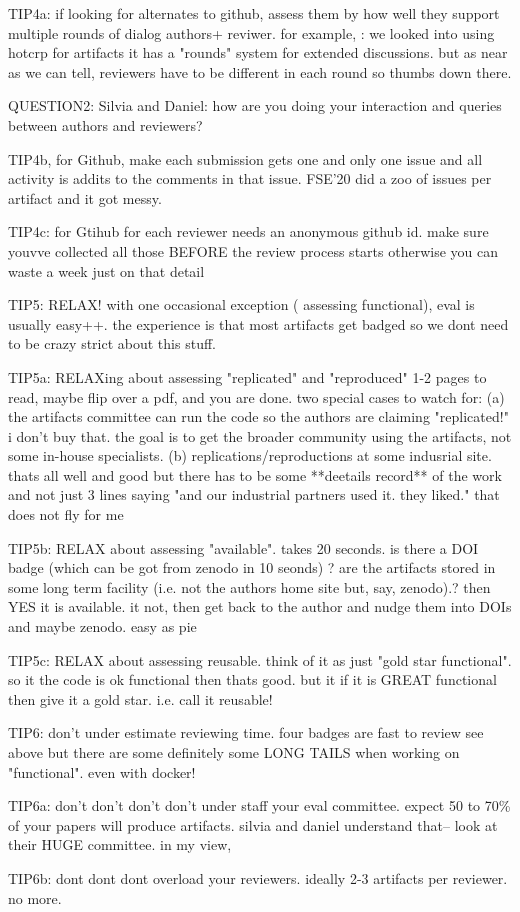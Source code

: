 \documentclass[smallextended]{svjour3}       %
\begin{document}
TIP4a: if looking for alternates to github, assess them by how well they support multiple rounds of dialog authors+ reviwer. for example, :  we looked into using hotcrp for artifacts it has a "rounds" system for extended discussions. but as near as we can tell, reviewers have to be different in each round so thumbs down there. 

QUESTION2:   Silvia and Daniel: how are you doing your interaction and queries between authors and reviewers?

TIP4b, for Github, make each submission gets one and only one issue and all activity is addits to the comments in that issue. FSE'20 did a zoo of issues per artifact and it got messy. 

TIP4c: for Gtihub for each reviewer needs an anonymous github id. make sure youvve collected all those BEFORE the review process starts otherwise you can waste a week just on that detail

TIP5: RELAX! with one occasional exception ( assessing functional), eval is usually easy++.  the experience is that most artifacts get badged so we dont need to be crazy strict about this stuff. 

TIP5a:   RELAXing  about assessing "replicated" and "reproduced" 1-2 pages to read, maybe flip over a pdf, and you are  done.  two special cases to watch for: 
(a)  the artifacts committee can run the code so the authors are claiming "replicated!" i don't buy that.  the goal is to get the broader community using the artifacts, not some in-house specialists. 
(b) replications/reproductions at some indusrial site. thats all well and good but there has to be some  **deetails record** of  the work and not just 3 lines saying "and our industrial partners used it. they liked." that does not fly for me

TIP5b:  RELAX about  assessing "available".   takes 20  seconds. is there a DOI badge (which can be got from zenodo in 10 seonds) ? are the artifacts stored in some long term facility (i.e. not the authors home site but, say, zenodo).? then YES it is available. it not, then get back to the author and nudge them into DOIs and maybe zenodo. easy as pie

TIP5c: RELAX about   assessing reusable. think of it as  just "gold star functional". so it the code is ok functional  then thats good. but it if it is GREAT functional then give it a gold star. i.e. call it reusable!

TIP6:  don't under estimate reviewing time.  four badges are fast to review see above but there are some definitely some LONG TAILS when working on "functional". even with docker!

TIP6a:  don't don't don't don't  under staff your eval committee. expect 50 to  70\% of your papers will produce  artifacts.   silvia and daniel understand that-- look at their HUGE committee. in my view,  

TIP6b: dont dont dont overload your reviewers. ideally 2-3 artifacts per reviewer. no more. 



\end{document}
